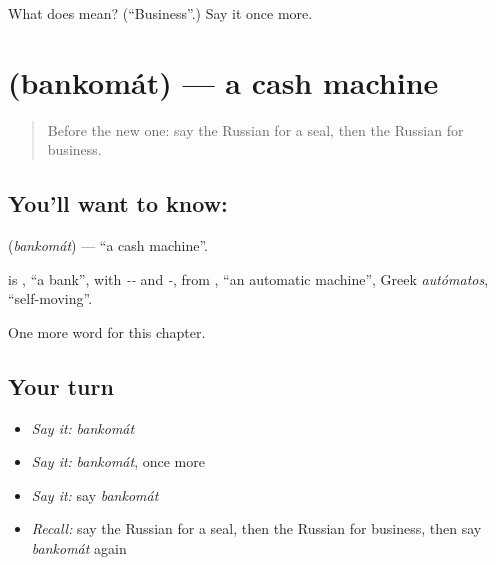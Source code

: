 \begin{tcolorbox}[breakable,colback=teal!4,colframe=teal!35!black,title={Before you move on}]
What does  mean? (\textquotedblleft{}Business\textquotedblright{}.) Say it once more.
\end{tcolorbox}
\section[\texorpdfstring{\ru{банкомат} (bankomát)}{банкомат (bankomát)}]{ (bankomát) — a cash machine}

\label{lesson:RU-C203-bankomat}



\begin{quote}
Before the new one: say the Russian for a seal, then the Russian for business.
\end{quote}

\subsection*{You'll want to know: }
\textbf{} (\emph{bankomát}) — \textquotedblleft{}a cash machine\textquotedblright{}.

\begin{cousinweb}
\textbf{} is \emph{}, \textquotedblleft{}a bank\textquotedblright{}, with \emph{--} and \emph{-}, from \emph{}, \textquotedblleft{}an automatic machine\textquotedblright{}, Greek \emph{autómatos}, \textquotedblleft{}self-moving\textquotedblright{}.
\end{cousinweb}

\begin{grammarlens}[title={What you've built}]
One more word for this chapter.
\end{grammarlens}

\subsection*{Your turn}
\begin{itemize}
\raggedright
  \item \emph{Say it:} \emph{bankomát}
  \item \emph{Say it:} \emph{bankomát}, once more
  \item \emph{Say it:} say \emph{bankomát}
  \item \emph{Recall:} say the Russian for a seal, then the Russian for business, then say \emph{bankomát} again
\end{itemize}

